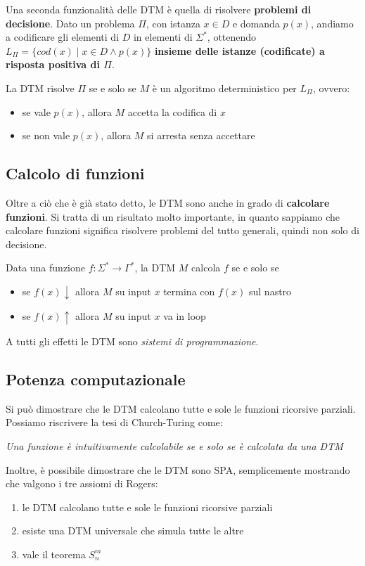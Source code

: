 Una seconda funzionalità delle DTM è quella di risolvere \textbf{problemi di decisione}. Dato un problema $\Pi$, con istanza $x \in D$ e domanda $p(x)$, andiamo a codificare gli elementi di $D$ in elementi di $\Sigma^\ast$, ottenendo $L_\Pi = \{cod(x) \mid x \in D \wedge p(x) \}$ \textbf{insieme delle istanze (codificate) a risposta positiva di $\Pi$}.

La DTM risolve $\Pi$ se e solo se $M$ è un algoritmo deterministico per $L_\Pi$, ovvero: 
\begin{itemize}
	\item se vale $p(x)$, allora $M$ accetta la codifica di $x$
	\item se non vale $p(x)$, allora $M$ si arresta senza accettare
\end{itemize}

\subsection{Calcolo di funzioni}

Oltre a ciò che è già stato detto, le DTM sono anche in grado di \textbf{calcolare funzioni}. Si tratta di un risultato molto importante, in quanto sappiamo che calcolare funzioni significa risolvere problemi del tutto generali, quindi non solo di decisione.

Data una funzione $f: \Sigma^\ast \rightarrow \Gamma^\ast$, la DTM $M$ calcola $f$ se e solo se
\begin{itemize}
	\item se $f(x) \downarrow$ allora $M$ su input $x$ termina con $f(x)$ sul nastro
	\item se $f(x) \uparrow$ allora $M$ su input $x$ va in loop
\end{itemize}
A tutti gli effetti le DTM sono \textit{sistemi di programmazione}.

\subsection{Potenza computazionale}

Si può dimostrare che le DTM calcolano tutte e sole le funzioni ricorsive parziali. Possiamo riscrivere la tesi di Church-Turing come: 
\begin{center}
	\textit{Una funzione è intuitivamente calcolabile se e solo se è calcolata da una DTM}
\end{center}

Inoltre, è possibile dimostrare che le DTM sono SPA, semplicemente mostrando che valgono i tre assiomi di Rogers: 
\begin{enumerate}
	\item le DTM calcolano tutte e sole le funzioni ricorsive parziali 
	\item esiste una DTM universale che simula tutte le altre
	\item vale il teorema $S^m_n$
\end{enumerate}

